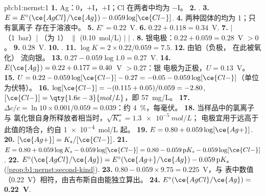 \begin{solution}{pb:b1:nernst:1}
\textbf{1.} Ag：0，$+$I，$+$I；Cl 在两者中均为 $-$I。
\textbf{2.} .
\textbf{3.} $E = E^\circ(\ce{AgCl}/\ce{Ag}) - 0.059\log[\ce{Cl-}]$.
\textbf{4.} 两种固体的均为 1；只有氯离子
存在于溶液中。
\textbf{5.} $E^\circ = 0.22$~V.
\textbf{6.} $0.22 + 0.118 = 0.34$~V.
\textbf{7.}  $|$ （\qty{1}{bar}）$|$ （为 1）
$\|$  (\qty{0.10}{mol/L}) $|$  $|$ .
\textbf{8.} 银电极：$0.22 + 0.059 = 0.28$~V $> 0$。
\textbf{9.} $0.28$~V.
\textbf{10.} .
\textbf{11.} $\log K = 2 \times 0.22/0.059 = 7.5$.
\textbf{12.} 由铂（负极， 在此被氧化）
流向银。
\textbf{13.} $0.27 - 0.059\log 1.0 = 0.27$~V.
\textbf{14.} $E(\ce{Ag}) = 0.22 + 0.177 = 0.40$~V $> 0.27$：银
电极为正极，$U = 0.13$~V。
\textbf{15.} $U = 0.22 - 0.059\log[\ce{Cl-}] - 0.27 = -0.05 -
0.059\log[\ce{Cl-}]$（单位为伏特）。
\textbf{16.} $\log[\ce{Cl-}] = -(0.115 + 0.05)/0.059 = -2.80$,
$[\ce{Cl-}] = \qty{1.6e-3}{mol/L}$，即 \qty{57}{mg/L}。
\textbf{17.} $\Delta c/c = \ln 10 \times 0.001/0.059 = 0.039$：约
\qty{4}{\percent}，每毫伏。
\textbf{18.} 当样品中的氯离子与
氯化银自身所释放者相当时，$\sqrt{K_s} = \qty{1.3e-5}{mol/L}$；
电极宜用于远高于此值的场合，约自 \qty{1e-4}{mol/L} 起。
\textbf{19.} $E = 0.80 + 0.059\log[\ce{Ag+}]$.
\textbf{20.} $[\ce{Ag+}] = K_s/[\ce{Cl-}]$.
\textbf{21.} $E = 0.80 + 0.059\log K_s - 0.059\log[\ce{Cl-}] = 0.80 -
0.059\,\mathrm{p}K_s - 0.059\log[\ce{Cl-}]$.
\textbf{22.} $E^\circ(\ce{AgCl}/\ce{Ag}) = E^\circ(\ce{Ag+}/\ce{Ag}) -
0.059\,\mathrm{p}K_s$ (\cref{prop:b1:nernst:second-kind}).
\textbf{23.} $0.80 - 0.059 \times 9.75 = 0.225$~V，与
表中数值（0.22~V）相符，由吉布斯自由能独立算出。
\textbf{24.} $E^\circ(\ce{AgCl}/\ce{Ag}) = $ \textbf{0.22~V}.
\end{solution}
